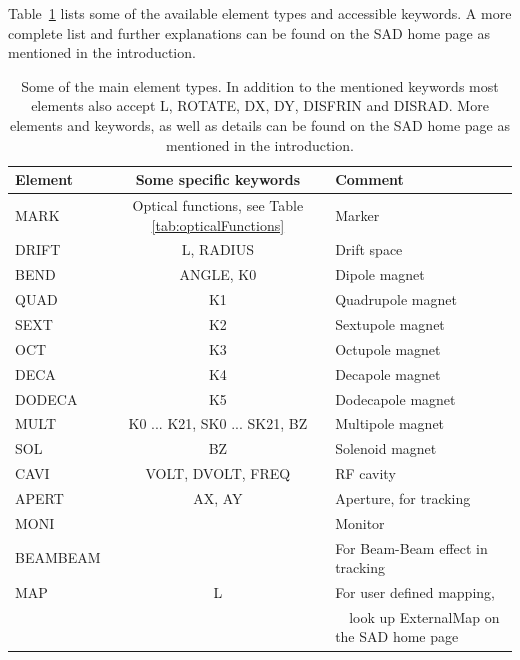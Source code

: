 \documentclass{article}
\begin{document}
Table~\ref{tab:elements} lists some of the available element types and accessible keywords. A more complete list and further explanations can be found on the SAD home page as mentioned in the introduction.

\begin{table}[t]
	\begin{center}
	\caption{Some of the main element types. In addition to the mentioned keywords most elements also accept L, ROTATE, DX, DY, DISFRIN and DISRAD. More elements and keywords, as well as details can be found on the SAD home page as mentioned in the introduction.}
	\label{tab:elements}
	\begin{tabular}[c]{lcl}
	Element		&	Some specific keywords		&	Comment				\\	\hline
	MARK		&	Optical functions, see Table \ref{tab:opticalFunctions}		 	&	Marker				\\
	DRIFT		&	L, RADIUS				&	Drift space			\\
	BEND		&	ANGLE, K0				&	Dipole magnet			\\
	QUAD		&	K1						&	Quadrupole magnet		\\
	SEXT		&	K2						&	Sextupole magnet		\\
	OCT 		&	K3						&	Octupole magnet		\\
	DECA		&	K4						&	Decapole magnet		\\
	DODECA		&	K5						&	Dodecapole magnet		\\
	MULT		&	K0 ... K21, SK0 ... SK21, BZ	&	Multipole magnet		\\
	SOL			&	BZ						&	Solenoid magnet		\\
	CAVI			&	VOLT, DVOLT, FREQ		&	RF cavity				\\
	APERT		&	AX,  AY					&	Aperture, for tracking		\\
	MONI		&							&	Monitor				\\
	BEAMBEAM	&							&	For Beam-Beam effect in tracking	\\
	MAP			& 	L						&	For user defined mapping, \\ & & \ \ look up ExternalMap on the SAD home page \\
	\end{tabular}
	\end{center}
\end{table}

\end{document}
